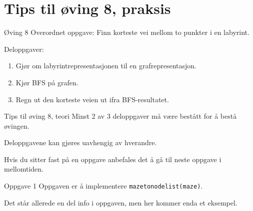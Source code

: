 \documentclass[14pt]{beamer}
\begin{document}
\section{Tips til øving 8, praksis}
\begin{frame}{Øving 8}
    Overordnet oppgave: Finn korteste vei mellom to punkter i en labyrint.

    \pause

    Deloppgaver:

    \begin{enumerate}
        \item<3-> Gjør om labyrintrepresentasjonen til en grafrepresentasjon.
        \item<4-> Kjør BFS på grafen.
        \item<5-> Regn ut den korteste veien ut ifra BFS-resultatet.
    \end{enumerate}
\end{frame}
\begin{frame}{Tips til øving 8, teori}
    Minst 2 av 3 deloppgaver må være bestått for å bestå øvingen.

    \pause

    Deloppgavene kan gjøres uavhengig av hverandre.

    \pause

    Hvis du sitter fast på en oppgave anbefales det å gå til neste oppgave i mellomtiden.
\end{frame}
\begin{frame}[fragile]{Oppgave 1}
    Oppgaven er å implementere \verb|mazetonodelist(maze)|.

    \pause

    Det står allerede en del info i oppgaven, men her kommer enda et eksempel.
\end{frame}
\end{document}
